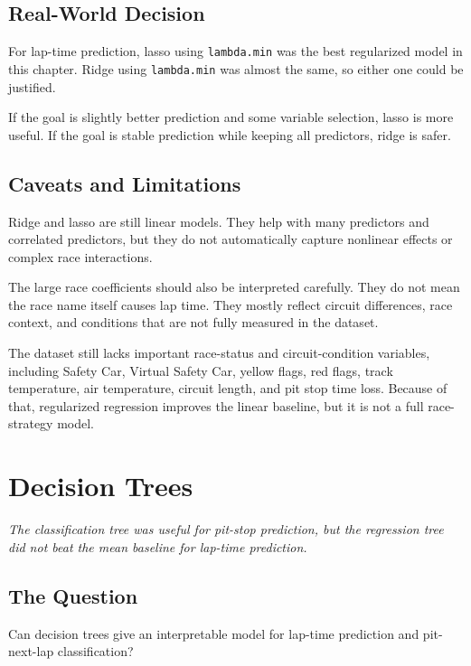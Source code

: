 \documentclass[11pt,oneside,openany]{book}
\newcommand{\chapterquote}[1]{%
\begin{center}
\small\textit{#1}
\end{center}
\vspace{-0.5em}
}
\begin{document}
\section{Real-World Decision}

For lap-time prediction, lasso using \texttt{lambda.min} was the best regularized model in this chapter. Ridge using \texttt{lambda.min} was almost the same, so either one could be justified.

If the goal is slightly better prediction and some variable selection, lasso is more useful. If the goal is stable prediction while keeping all predictors, ridge is safer.

\section{Caveats and Limitations}

Ridge and lasso are still linear models. They help with many predictors and correlated predictors, but they do not automatically capture nonlinear effects or complex race interactions.

The large race coefficients should also be interpreted carefully. They do not mean the race name itself causes lap time. They mostly reflect circuit differences, race context, and conditions that are not fully measured in the dataset.

The dataset still lacks important race-status and circuit-condition variables, including Safety Car, Virtual Safety Car, yellow flags, red flags, track temperature, air temperature, circuit length, and pit stop time loss. Because of that, regularized regression improves the linear baseline, but it is not a full race-strategy model.



\chapter{Decision Trees}
\chapterquote{The classification tree was useful for pit-stop prediction, but the regression tree did not beat the mean baseline for lap-time prediction.}

\section{The Question}

Can decision trees give an interpretable model for lap-time prediction and pit-next-lap classification?
\end{document}
